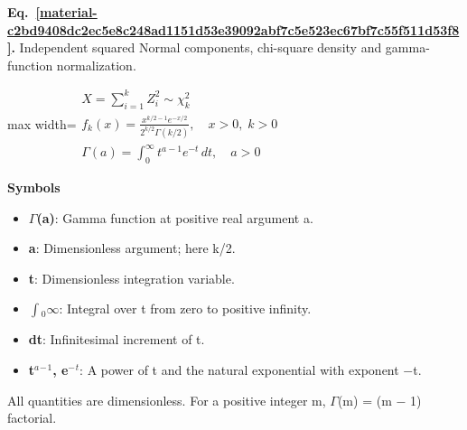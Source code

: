 \documentclass[11pt,a4paper]{article}
\begin{document}
\par\medskip
\begin{samepage}
\label{material-c2bd9408dc2ec5e8c248ad1151d53e39092abf7c5e523ec67bf7c55f511d53f8}
\noindent\textbf{Eq.~\ref*{material-c2bd9408dc2ec5e8c248ad1151d53e39092abf7c5e523ec67bf7c55f511d53f8}.} Independent squared Normal components, chi-square density and gamma-function normalization.\par\nopagebreak
\begin{center}\begin{adjustbox}{max width=\linewidth}$\displaystyle \begin{gathered}X=\sum_{i=1}^{k}Z_i^2\sim\chi^2_k\\f_k(x)=\frac{x^{k/2-1}e^{-x/2}}{2^{k/2}\Gamma(k/2)},\quad x>0,\;k>0\\\Gamma(a)=\int_0^\infty t^{a-1}e^{-t}\,dt,\quad a>0\end{gathered}$\end{adjustbox}\end{center}

\par\noindent\textbf{Symbols}

\begin{itemize}\setlength{\itemsep}{1pt}\setlength{\parsep}{0pt}
\item \textbf{\ensuremath{\Gamma}(a)}: Gamma function at positive real argument a.
\item \textbf{a}: Dimensionless argument; here k/2.
\item \textbf{t}: Dimensionless integration variable.
\item \textbf{\ensuremath{\int}\ensuremath{{}_0}\ensuremath{\infty}}: Integral over t from zero to positive infinity.
\item \textbf{dt}: Infinitesimal increment of t.
\item \textbf{t\ensuremath{{}^a}\ensuremath{{}^-}\ensuremath{{}^1}, e\ensuremath{{}^-}\ensuremath{{}^t}}: A power of t and the natural exponential with exponent \ensuremath{-}t.
\end{itemize}

All quantities are dimensionless. For a positive integer m, \ensuremath{\Gamma}(m) = (m \ensuremath{-} 1) factorial.


\end{samepage}
\end{document}
